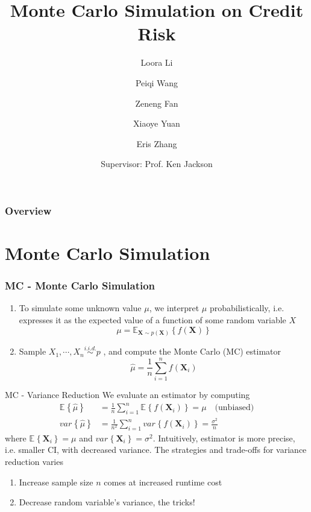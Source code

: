 \documentclass{beamer}
\title[]{Monte Carlo Simulation on Credit Risk}
\author[Loora, Peiqi]{Loora Li \and Peiqi Wang \and Zeneng Fan \and Xiaoye Yuan \and Eris Zhang}
\date[July 5th, 2018]{Supervisor: Prof. Ken Jackson }
\newcommand{\matr}[1]{\mathbf{#1}}
\newcommand{\E}[2][]{\mathbb{E}_{#1}\left\{#2\right\}}
\newcommand{\var}[2][]{var_{#1}\left\{#2\right\}}
\newcommand{\bX}{\matr{X}}
\begin{document}
\frame{\titlepage}
\begin{frame}
    \frametitle{Overview}
    \tableofcontents
\end{frame}


\section{Monte Carlo Simulation}


\begin{frame}
\frametitle{MC - Monte Carlo Simulation}
\begin{enumerate} 
    \item To simulate some unknown value $\mu$, we interpret $\mu$ probabilistically, i.e. expresses it as the expected value of a function of some random variable $X$
    \[
        \mu = \E[\bX \sim p(\bX)]{f(\bX)}
    \]
    \item Sample $X_1, \cdots, X_n \overset{i.i.d.}{\sim} p$ , and compute the Monte Carlo (MC) estimator
    \[
        \hat{\mu} = \frac{1}{n} \sum_{i=1}^n f(\bX_i)
    \]
\end{enumerate}    
\end{frame}





\begin{frame}{MC - Variance Reduction}
We evaluate an estimator by computing
\begin{align*}
    \E{\hat{\mu}} &= \frac{1}{n} \sum_{i=1}^n \E{f(\bX_i)} = \mu \quad \text{(unbiased)} \\ 
     \var{\hat{\mu}} &= \frac{1}{n^2}\sum_{i=1}^n \var{f(\bX_i)} = \frac{\sigma^2}{n}
\end{align*}
where $\E{\bX_i} = \mu$ and $\var{\bX_i}=\sigma^2$. Intuitively, estimator is more precise, i.e. smaller CI, with decreased variance. The strategies and trade-offs for variance reduction varies
\begin{enumerate}
    \item Increase sample size $n$ comes at increased runtime cost
    \item Decrease random variable's variance, the tricks!
\end{enumerate}
\end{frame}
\end{document}

